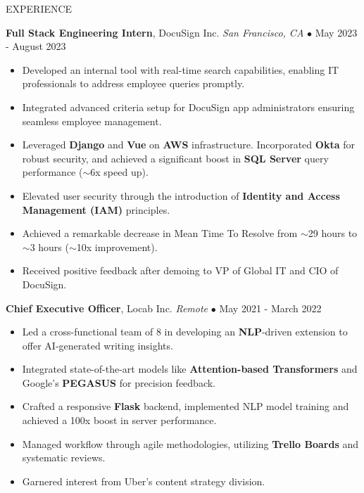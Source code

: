 \documentclass{resume} %
\begin{document}
\begin{rSection}{EXPERIENCE}

\textbf{Full Stack Engineering Intern}, DocuSign Inc. \hfill \textit{San Francisco, CA} $\bullet$ May 2023 - August 2023
\vspace{-2mm}
\begin{itemize}
\itemsep -6pt {}
\item Developed an internal tool with real-time search capabilities, enabling IT professionals to address employee queries promptly.
\item Integrated advanced criteria setup for DocuSign app administrators ensuring seamless employee management.
\item Leveraged \textbf{Django} and \textbf{Vue} on \textbf{AWS} infrastructure. Incorporated \textbf{Okta} for robust security, and achieved a significant boost in \textbf{SQL Server} query performance (\(\sim \)6x speed up).
\item Elevated user security through the introduction of \textbf{Identity and Access Management (IAM)} principles.
\item Achieved a remarkable decrease in Mean Time To Resolve from \(\sim \)29 hours to \(\sim \)3 hours (\(\sim \)10x improvement).
\item Received positive feedback after demoing to VP of Global IT and CIO of DocuSign.\end{itemize}

\vspace{-1mm}

\textbf{Chief Executive Officer}, Locab Inc. \hfill \textit{Remote} $\bullet$ May 2021 - March 2022
\vspace{-2mm}
\begin{itemize}
\itemsep -6pt {}
\item Led a cross-functional team of 8 in developing an \textbf{NLP}-driven extension to offer AI-generated writing insights.
\item Integrated state-of-the-art models like \textbf{Attention-based Transformers} and Google's \textbf{PEGASUS} for precision feedback.
\item Crafted a responsive \textbf{Flask} backend, implemented NLP model training and achieved a 100x boost in server performance.
\item Managed workflow through agile methodologies, utilizing \textbf{Trello Boards} and systematic reviews.
\item Garnered interest from Uber's content strategy division.\end{itemize}


\end{rSection}
\end{document}
